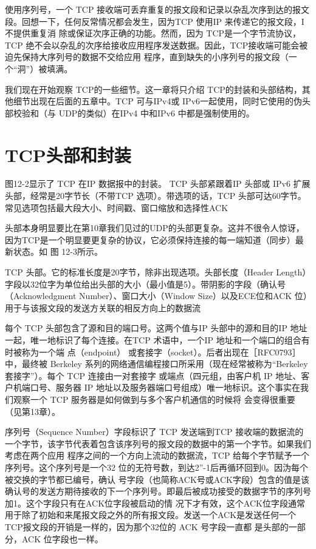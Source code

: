 使用序列号，一个 TCP 接收端可丢弃重复的报文段和记录以杂乱次序到达的报文段。回想一下，任何反常情况都会发生，因为TCP 使用IP 来传递它的报文段，I不提供重复消
除或保证次序正确的功能。然而，因为 TCP是一个字节流协议，TCP 绝不会以杂乱的次序给接收应用程序发送数据。因此，TCP接收端可能会被迫先保持大序列号的数据不交给应用
程序，直到缺失的小序列号的报文段（一个“洞”）被填满。

我们现在开始观察 TCP的一些细节。这一章将只介绍 TCP的封装和头部结构，其他细节出现在后面的五章中。TCP 可与IPv4或 IPv6一起使用，同时它使用的伪头部校验和（与
UDP的类似）在IPv4 中和IPv6 中都是强制使用的。
\section{TCP头部和封装}
图12-2显示了 TCP 在IP 数据报中的封装。
TCP 头部紧跟着IP 头部或 IPv6 扩展头部，经常是20字节长（不带TCP 选项）。带选项的话，TCP 头部可达60字节。常见选项包括最大段大小、时间戳、窗口缩放和选择性ACK

头部本身明显要比在第10章我们见过的UDP的头部更复杂。这并不很令人惊讶，因为TCP是一个明显要更复杂的协议，它必须保持连接的每一端知道（同步）最新状态。如
图 12-3所示。

TCP 头部。它的标准长度是20字节，除非出现选项。头部长度（Header Length）字段以32位字为单位给出头部的大小（最小值是5）。带阴影的字段（确认号（Acknowledgment
Number）、窗口大小（Window Size）以及ECE位和ACK 位）用于与该报文段的发送方关联的相反方向上的数据流

每个 TCP 头部包含了源和目的端口号。这两个值与IP 头部中的源和目的IP 地址一起，唯一地标识了每个连接。在TCP 术语中，一个IP 地址和一个端口的组合有时被称为一个端
点（endpoint） 或套接字（socket）。后者出现在［RFC0793］ 中，最终被 Berkeley 系列的网络通信编程接口所采用（现在经常被称为“Berkeley套接字”）。每个 TCP 连接由一对套接字
或端点（四元组，由客户机 IP 地址、客户机端口号、服务器 IP 地址以及服务器端口号组成）唯一地标识。这个事实在我们观察一个 TCP 服务器是如何做到与多个客户机通信的时候将
会变得很重要（见第13章）。

序列号（Sequence Number）字段标识了 TCP 发送端到TCP 接收端的数据流的一个字节，该字节代表着包含该序列号的报文段的数据中的第一个字节。如果我们考虑在两个应用
程序之间的一个方向上流动的数据流，TCP 给每个字节赋予一个序列号。这个序列号是一个32 位的无符号数，到达2”-1后再循环回到0。因沩每个被交换的字节都已编号，确认
号字段（也简称ACK号或ACK字段）包含的值是该确认号的发送方期待接收的下一个序列号。即最后被成功接受的数据字节的序列号加1。这个字段只有在ACK位字段被启动的情
况下才有效，这个ACK位字段通常用于除了初始和来尾报文段之外的所有报文段。发送一个ACK是发送任何一个TCP报文段的开销是一样的，因为那个32位的 ACK 号字段一直都
是头部的一部分，ACK 位字段也一样。

